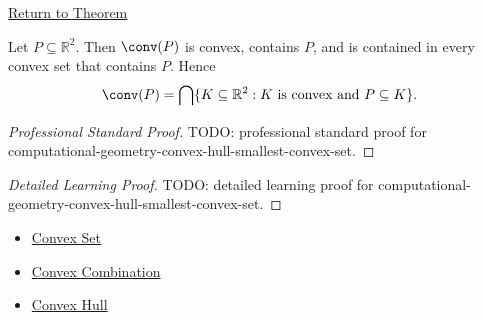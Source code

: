 \newpage
{}
\label{prf:computational-geometry-convex-hull-smallest-convex-set}

\begin{remark*}[Return]
\hyperref[lem:computational-geometry-convex-hull-smallest-convex-set]{Return to Theorem}

\end{remark*}

\begin{lemma*}
Let \(P\subseteq\mathbb{R}^2\). Then \(\conv(P)\) is convex, contains \(P\), and
is contained in every convex set that contains \(P\). Hence
\[
  \conv(P)
  =
  \bigcap\{K\subseteq\mathbb{R}^2 : K\text{ is convex and }P\subseteq K\}.
\]
\end{lemma*}

\begin{proof}[Professional Standard Proof]
\LRAProofBodyStart
TODO: professional standard proof for computational-geometry-convex-hull-smallest-convex-set.
\end{proof}

\begin{proof}[Detailed Learning Proof]
\LRAProofBodyStart
TODO: detailed learning proof for computational-geometry-convex-hull-smallest-convex-set.
\end{proof}

\begin{remark*}
\end{remark*}

\begin{dependencies}
\begin{itemize}
  \item \hyperref[def:computational-geometry-convex-set]{Convex Set}
  \item \hyperref[def:computational-geometry-convex-combination]{Convex Combination}
  \item \hyperref[def:computational-geometry-convex-hull]{Convex Hull}
\end{itemize}
\end{dependencies}

\clearpage

